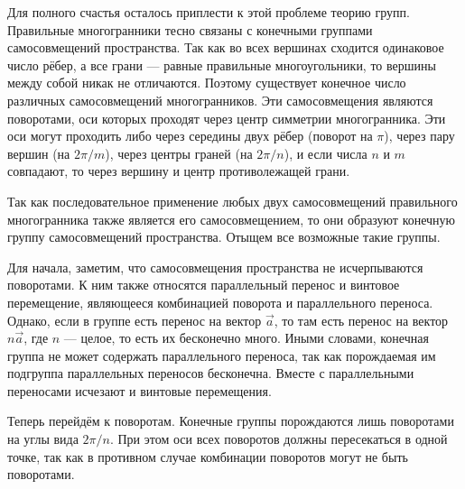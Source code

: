 Для полного счастья осталось приплести к этой проблеме теорию групп. Правильные многогранники тесно связаны с конечными группами самосовмещений пространства. Так как во всех вершинах сходится одинаковое число рёбер, а все грани --- равные правильные многоугольники, то вершины между собой никак не отличаются. Поэтому существует конечное число различных самосовмещений многогранников. Эти самосовмещения являются поворотами, оси которых проходят через центр симметрии многогранника. Эти оси могут проходить либо через середины двух рёбер (поворот на \(\pi\)), через пару вершин (на \(2\pi/m\)), через центры граней (на \(2\pi/n\)), и если числа \(n\) и \(m\) совпадают, то через вершину и центр противолежащей грани.

Так как последовательное применение любых двух самосовмещений правильного многогранника также является его самосовмещением, то они образуют конечную группу самосовмещений пространства. Отыщем все возможные такие группы.

Для начала, заметим, что самосовмещения пространства не исчерпываются поворотами. К ним также относятся параллельный перенос и винтовое перемещение, являющееся комбинацией поворота и параллельного переноса. Однако, если в группе есть перенос на вектор \(\vec{a}\), то там есть перенос на вектор \( n\vec{a} \), где \(n\) --- целое, то есть их бесконечно много. Иными словами, конечная группа не может содержать параллельного переноса, так как порождаемая им подгруппа параллельных переносов бесконечна. Вместе с параллельными переносами исчезают и винтовые перемещения.

Теперь перейдём к поворотам. Конечные группы порождаются лишь поворотами на углы вида \( 2\pi / n \). При этом оси всех поворотов должны пересекаться в одной точке, так как в противном случае комбинации поворотов могут не быть поворотами.

